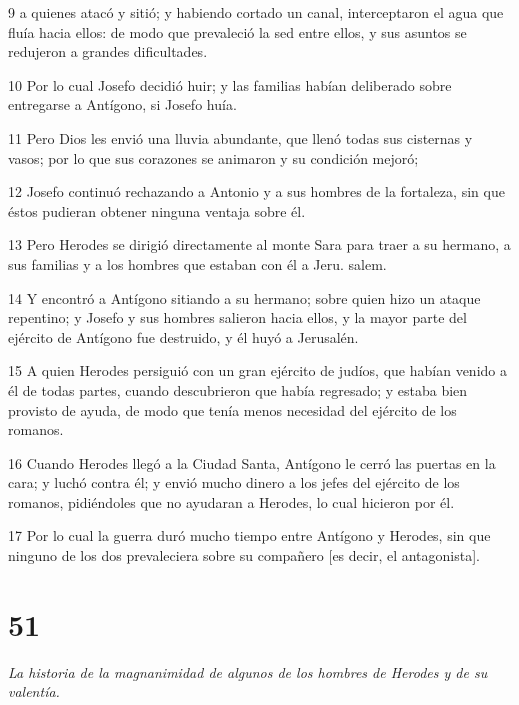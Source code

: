 \par 9 a quienes atacó y sitió; y habiendo cortado un canal, interceptaron el agua que fluía hacia ellos: de modo que prevaleció la sed entre ellos, y sus asuntos se redujeron a grandes dificultades.

\par 10 Por lo cual Josefo decidió huir; y las familias habían deliberado sobre entregarse a Antígono, si Josefo huía.

\par 11 Pero Dios les envió una lluvia abundante, que llenó todas sus cisternas y vasos; por lo que sus corazones se animaron y su condición mejoró;

\par 12 Josefo continuó rechazando a Antonio y a sus hombres de la fortaleza, sin que éstos pudieran obtener ninguna ventaja sobre él.

\par 13 Pero Herodes se dirigió directamente al monte Sara para traer a su hermano, a sus familias y a los hombres que estaban con él a Jeru. salem.

\par 14 Y encontró a Antígono sitiando a su hermano; sobre quien hizo un ataque repentino; y Josefo y sus hombres salieron hacia ellos, y la mayor parte del ejército de Antígono fue destruido, y él huyó a Jerusalén.

\par 15 A quien Herodes persiguió con un gran ejército de judíos, que habían venido a él de todas partes, cuando descubrieron que había regresado; y estaba bien provisto de ayuda, de modo que tenía menos necesidad del ejército de los romanos.

\par 16 Cuando Herodes llegó a la Ciudad Santa, Antígono le cerró las puertas en la cara; y luchó contra él; y envió mucho dinero a los jefes del ejército de los romanos, pidiéndoles que no ayudaran a Herodes, lo cual hicieron por él.

\par 17 Por lo cual la guerra duró mucho tiempo entre Antígono y Herodes, sin que ninguno de los dos prevaleciera sobre su compañero [es decir, el antagonista].

\chapter{51}

\par \textit{La historia de la magnanimidad de algunos de los hombres de Herodes y de su valentía.}


